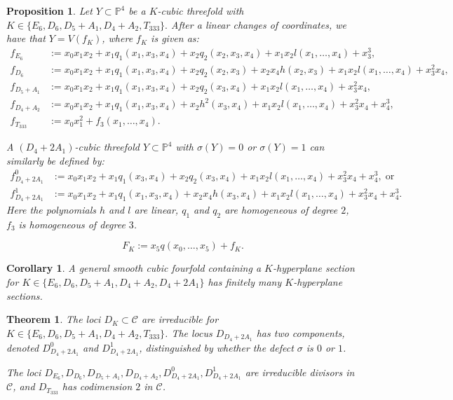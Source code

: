 \documentclass[10pt,a4paper]{amsart}
\newtheorem{proposition}{Proposition}
\newtheorem{theorem}{Theorem}
\newtheorem{corollary}{Corollary}
\newcommand{\bP}{\mathbb{P}}
\newcommand{\calC}{\mathcal{C}}
\begin{document}
\begin{proposition} \label{prop: equations}
    Let $Y\subset \bP^4$ be a $K$-cubic threefold with $K\in \{E_6, D_6, D_5+A_1, D_4+A_2, T_{333}\}.$ After a linear changes of coordinates, we have that $Y=V(f_K)$, where $f_K$ is given as:
    \begin{align*}
        f_{E_6}&:=x_0x_1x_2+x_1q_1(x_1,x_3,x_4)+x_2q_2(x_2,x_3,x_4)+x_1x_2l(x_1,\ldots,x_4)+x_3^3,\\
        f_{D_6}&:=x_0x_1x_2+x_1q_1(x_1,x_3,x_4)+x_2q_2(x_2,x_3)+x_2x_4h(x_2,x_3)+x_1x_2l(x_1,\ldots,x_4)+x_3^2x_4,\\
        f_{D_5+A_1}&:=x_0x_1x_2+x_1q_1(x_1,x_3,x_4)+x_2q_2(x_3,x_4)+x_1x_2l(x_1,\ldots,x_4)+x_3^2x_4,\\
        f_{D_4+A_2}&:=x_0x_1x_2+x_1q_1(x_1,x_3,x_4)+x_2h^2(x_3,x_4)+x_1x_2l(x_1,\ldots,x_4)+x_3^2x_4+x_4^3,\\
        f_{T_{333}}&:=x_0x_1^2+f_3(x_1,\ldots,x_4).
    \end{align*}

    A $(D_4+2A_1)$-cubic threefold $Y\subset\bP^4$ with $\sigma(Y)=0$ or $\sigma(Y)=1$ can similarly be defined by:
    \begin{align*}
    f_{D_4+2A_1}^0&:=x_0x_1x_2+x_1q_1(x_3,x_4)+x_2q_2(x_3,x_4)+x_1x_2l(x_1,\ldots,x_4)+x_3^2x_4+x_4^3,\;\text{or}\\        f_{D_4+2A_1}^1&:=x_0x_1x_2+x_1q_1(x_1,x_3,x_4)+x_2x_4h(x_3,x_4)+x_1x_2l(x_1,\ldots,x_4)+x_3^2x_4+x_4^3.
    \end{align*}
    Here the polynomials $h$ and $l$ are linear, $q_1$ and $q_2$ are homogeneous of degree $2$, $f_3$ is homogeneous of degree $3$.
\end{proposition}

\begin{equation}\label{eqn: fourfold}
        F_K:=x_5q(x_0,\ldots,x_5)+f_K.
    \end{equation}

\begin{corollary} \label{E6 discrete fibers}
    A general smooth cubic fourfold containing a $K$-hyperplane section for $K\in \{E_6, D_6,D_5+A_1, D_4+A_2,D_4+2A_1\}$ has finitely many $K$-hyperplane sections.
\end{corollary}

\begin{theorem}\label{theorem: divisors}
    The loci $D_{K}\subset\calC$ are irreducible for $K\in\{E_6,D_6,D_5+A_1,D_4+A_2,T_{333}\}$. The locus $D_{D_4+2A_1}$ has two components, denoted $D_{D_4+2A_1}^0$ and $D_{D_4+2A_1}^1$, distinguished by whether the defect $\sigma$ is $0$ or $1$.
    
    The loci $D_{E_6}, D_{D_6}, D_{D_5+A_1}, D_{D_4+A_2}, D_{D_4+2A_1}^0, D_{D_4+2A_1}^1$ are irreducible divisors in $\calC$, and $D_{T_{333}}$ has codimension $2$ in $\calC$.
\end{theorem}
\end{document}
